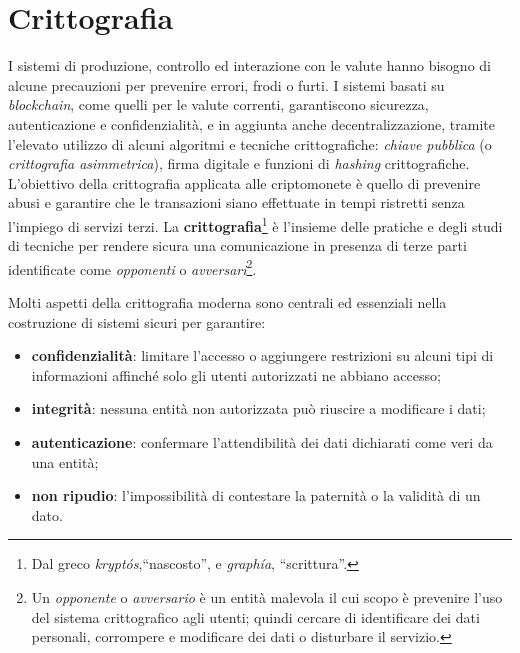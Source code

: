 \chapter{Crittografia}

I sistemi di produzione, controllo ed interazione con le valute hanno bisogno di alcune precauzioni per prevenire errori, frodi o furti.
I sistemi basati su \textit{blockchain}, come quelli per le valute correnti, garantiscono sicurezza, autenticazione e confidenzialità, e in aggiunta anche decentralizzazione, tramite l'elevato utilizzo di alcuni algoritmi e tecniche crittografiche: \textit{chiave pubblica} (o \textit{crittografia asimmetrica}), firma digitale e funzioni di \textit{hashing} crittografiche.\newline
L'obiettivo della crittografia applicata alle criptomonete è quello di prevenire abusi e garantire che le transazioni siano effettuate in tempi ristretti senza l'impiego di servizi terzi.\newline\newline
La \textbf{crittografia}\footnote{Dal greco \textit{kryptós},``nascosto'', e \textit{graphía}, ``scrittura''.} è l'insieme delle pratiche e degli studi di tecniche per rendere sicura una comunicazione in presenza di terze parti identificate come \emph{opponenti} o \emph{avversari}\footnote{Un \textit{opponente} o \textit{avversario} è un entità malevola il cui scopo è prevenire l'uso del sistema crittografico agli utenti; quindi cercare di identificare dei dati personali, corrompere e modificare dei dati o disturbare il servizio.}.

Molti aspetti della crittografia moderna sono centrali ed essenziali nella costruzione di sistemi sicuri per garantire:
\begin{itemize}
    \item \textbf{confidenzialità}: limitare l'accesso o aggiungere restrizioni su alcuni tipi di informazioni affinché solo gli utenti autorizzati ne abbiano accesso;
    \item \textbf{integrità}: nessuna entità non autorizzata può riuscire a modificare i dati;
    \item \textbf{autenticazione}: confermare l'attendibilità dei dati dichiarati come veri da una entità;
    \item \textbf{non ripudio}: l'impossibilità di contestare la paternità o la validità di un dato.
\end{itemize}

